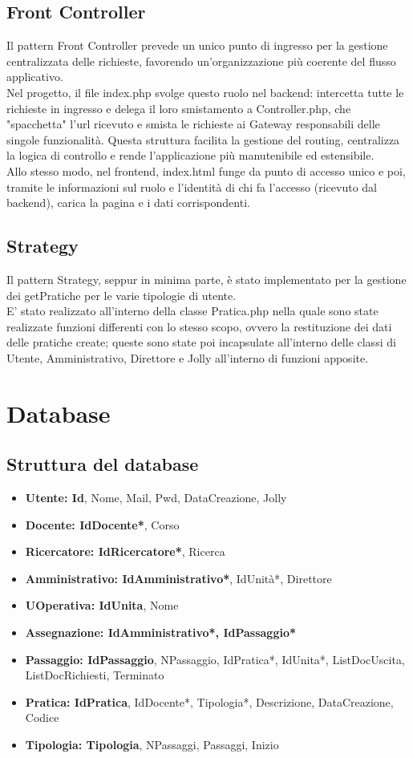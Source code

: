 \documentclass{article}
\begin{document}
\subsection{Front Controller}
Il pattern Front Controller prevede un unico punto di ingresso per la gestione centralizzata delle richieste, favorendo un'organizzazione più coerente del flusso applicativo.\\
Nel progetto, il file index.php svolge questo ruolo nel backend: intercetta tutte le richieste in ingresso e delega il loro smistamento a Controller.php, che "spacchetta" l'url ricevuto e smista le richieste ai Gateway responsabili delle singole funzionalità. Questa struttura facilita la gestione del routing, centralizza la logica di controllo e rende l'applicazione più manutenibile ed estensibile.\\
Allo stesso modo, nel frontend, index.html funge da punto di accesso unico e poi, tramite le informazioni sul ruolo e l'identità di chi fa l'accesso (ricevuto dal backend), carica la pagina e i dati corrispondenti.
\subsection{Strategy}
Il pattern Strategy, seppur in minima parte, è stato implementato per la gestione dei getPratiche per le varie tipologie di utente.\\E' stato realizzato all'interno della classe Pratica.php nella quale sono state realizzate funzioni differenti con lo stesso scopo, ovvero la restituzione dei dati delle pratiche create; queste sono state poi incapsulate all'interno delle classi di Utente, Amministrativo, Direttore e Jolly all'interno di funzioni apposite.
\section{Database}

\subsection{Struttura del database}
\begin{itemize}
    \item \textbf{Utente:  Id}, Nome, Mail, Pwd, DataCreazione, Jolly  
    \item \textbf{Docente:  IdDocente*}, Corso
    \item \textbf{Ricercatore:  IdRicercatore*}, Ricerca
    \item \textbf{Amministrativo:  IdAmministrativo*}, IdUnità*, Direttore
    \item \textbf{UOperativa:  IdUnita}, Nome
    \item \textbf{Assegnazione:  IdAmministrativo*, IdPassaggio*}
    \item \textbf{Passaggio:  IdPassaggio}, NPassaggio, IdPratica*, IdUnita*, ListDocUscita, ListDocRichiesti, Terminato 
    \item \textbf{Pratica:  IdPratica}, IdDocente*, Tipologia*, Descrizione, DataCreazione, Codice
    \item \textbf{Tipologia: Tipologia}, NPassaggi, Passaggi, Inizio
\end{itemize}
\end{document}
